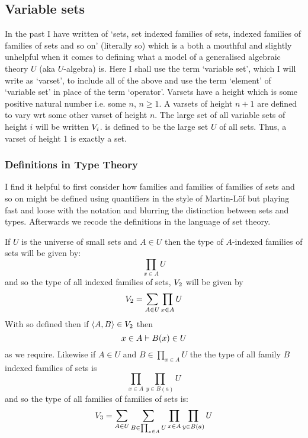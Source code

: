 \documentclass[10pt,a4paper]{scrartcl}
\begin{document}
\subsection{Variable sets}
\noindent In the past I have written of `sets, 
set indexed families of sets, indexed families of families of sets and so on' (literally so) which is  a both a mouthful and slightly unhelpful when it comes to
defining what a model of a generalised algebraic theory $U$ (aka $U$-algebra) is.
\noindent
Here I shall use the term `variable set', which I will write as `varset', to include all of the above and use the term `element'  of `variable set' in place of the term `operator'.
\noindent
Varsets have a height which is some positive natural number i.e. some $n$, $n \geq 1$. A varsets of height $n+1$ are defined to vary wrt some other varset of height $n$. The large set of all variable sets of height $i$ will be written $\varset[i]$.
\varset[1] is defined to be the large set $U$ of all sets. Thus, a varset of height 1 is exactly a set. 

\subsubsection{Definitions in Type Theory}
I find it helpful to first consider how families and families of families of sets and so on might be defined using quantifiers in the style of Martin-L\"of but playing fast and loose with the notation and blurring the distinction between sets and types. Afterwards we recode the definitions in the language of set theory. 

\noindent
If $U$ is the universe of small sets  and $A \in U$ then the type 
of $A$-indexed families of sets will be given by:
\begin{equation*}
\prod_{x \in A}U
\end{equation*}
and so the type of all indexed families of sets, $\varset[2]$ will be given by
\begin{equation*}
\varset[2]=\sum_{A \in U}\prod_{x \in A}U
\end{equation*}
With \varset[2] so defined then if $\tuple{A,B} \in \varset[2]$ then
\begin{equation*}
x \in A \tstyle B(x) \in U 
\end{equation*}
as we require.
\noindent
Likewise if  $A \in U$ and $B \in \prod_{x \in A}U$ the the type of all
family $B$ indexed families of sets is
\begin{equation*}
\prod_{x \in A}\prod_{y \in B(a)}U
\end{equation*}
and so the type of all families of families of sets is:
\begin{equation*}
\varset[3]=\sum_{A \in U}\sum_{B \in \prod_{x \in A}U} \prod_{x \in A}\prod_{y \in B(a)}U
\end{equation*}
\end{document}
